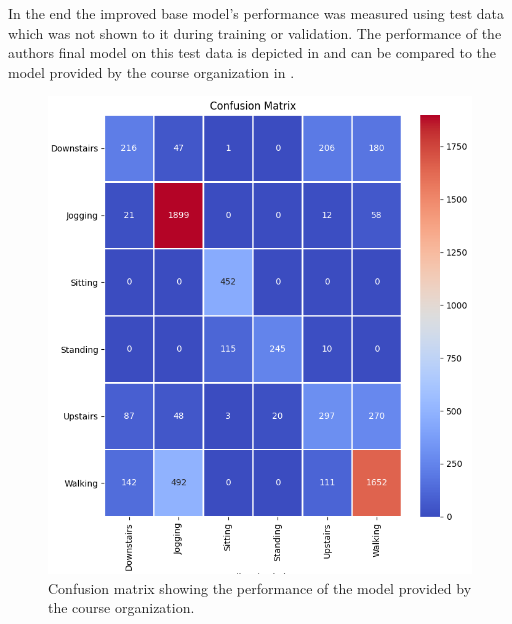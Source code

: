 In the end the improved base model's performance was measured using test data which was not shown to it during training or validation. The performance of the authors final model on this test data is depicted in  and can be compared to the model provided by the course organization in .
\begin{figure}[htpb]
\centering
\includegraphics[width=\linewidth]{GithubConfusion}
\caption{Confusion matrix showing the performance of the model provided by the course organization.}
\label{myfig:GithubConfusion}
\end{figure}
